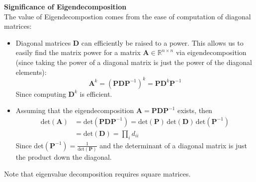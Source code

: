 \documentclass{report}
\begin{document}
\textbf{Significance of Eigendecomposition}\\
The value of Eigendecompostion comes from the ease of computation of diagonal matrices:
\begin{itemize}
\item Diagonal matrices $\bm{D}$ can efficiently be raised to a power. This allows us to easily find the matrix
power for a matrix $\bm{A}\in\mathbb{R}^{n\times n}$ via
eigendecomposition (since taking the power of a diagonal matrix is just the power of the diagonal elements):
\begin{equation*}
\bm{A}^k=(\bm{PDP}^{-1})^k=\bm{PD}^k\bm{P}^{-1}
\end{equation*}
Since computing $\bm{D}^k$ is efficient.
\item Assuming that the eigendecomposition $\bm{A}=\bm{PDP}^{-1}$ exists, then
\begin{align*}
\text{det}(\bm{A})&=\text{det}(\bm{PDP}^{-1})=\text{det}(\bm{P})\,\text{det}(\bm{D})\,\text{det}(\bm{P}^{-1})\\
&=\text{det}(\bm{D})=\prod_{i}d_{ii}
\end{align*}
Since det$(\bm{P}^{-1})=\frac{1}{\text{det}(\bm{P})}$ and the determinant of a diagonal matrix is just the product
down the diagonal.
\end{itemize}
Note that eigenvalue decomposition requires square matrices. 
\newpage
\end{document}
